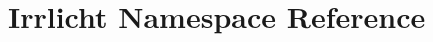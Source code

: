 \hypertarget{namespace_irrlicht}{}\section{Irrlicht Namespace Reference}
\label{namespace_irrlicht}
